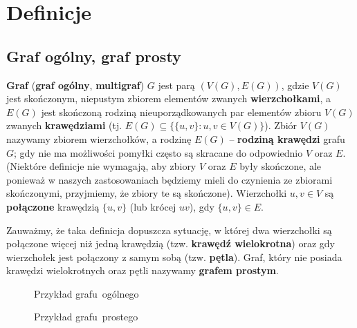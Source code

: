 \section{Definicje}

\subsection*{Graf ogólny, graf prosty}
\textbf{Graf} (\textbf{graf ogólny}, \textbf{multigraf}) $G$ jest parą $(V(G),E(G))$, gdzie $V(G)$ jest skończonym, niepustym zbiorem elementów zwanych \textbf{wierzchołkami}, a $E(G)$ jest skończoną rodziną nieuporządkowanych par elementów zbioru $V(G)$ zwanych \textbf{krawędziami} \cite[20]{wilson} (tj. $E(G) \subseteq \{\{u,v\} : u,v \in V(G)\}$). Zbiór $V(G)$ nazywamy zbiorem wierzchołków, a rodzinę $E(G)$ -- \textbf{rodziną krawędzi} grafu $G$; gdy nie ma możliwości pomyłki często są skracane do odpowiednio $V$ oraz $E$. (Niektóre definicje nie wymagają, aby zbiory $V$ oraz $E$ były skończone\cite[143]{ross}, ale ponieważ w naszych zastosowaniach będziemy mieli do czynienia ze zbiorami skończonymi, przyjmiemy, że zbiory te są skończone).  Wierzchołki $u,v \in V$ są \textbf{połączone} krawędzią $\{u,v\}$ (lub krócej $uv$), gdy $\{u,v\} \in E$. 

Zauważmy, że taka definicja dopuszcza sytuację, w której dwa wierzchołki są połączone więcej niż jedną krawędzią (tzw. \textbf{krawędź wielokrotna}) oraz gdy wierzchołek jest połączony z samym sobą (tzw. \textbf{pętla}). Graf, który nie posiada krawędzi wielokrotnych oraz pętli nazywamy \textbf{grafem prostym}\cite[19]{wilson}.

\begin{figure}[h]
\centering
\begin{minipage}{.45\textwidth}
  \centering
\captionsetup{justification=centering}
\caption{Przykład grafu~ogólnego} \label{fig:simple-graph}
\end{minipage}
\begin{minipage}{.45\textwidth}
  \centering
\captionsetup{justification=centering}
\caption{Przykład grafu~prostego} \label{fig:graph}
\end{minipage}
\end{figure}


